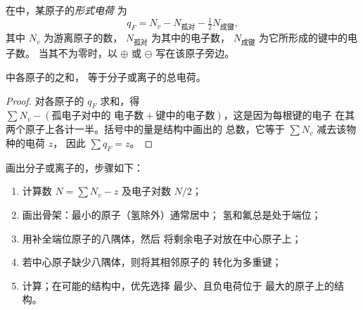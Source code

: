 \begin{definition}[形式电荷]\label{def:b1:lewis-resonance-vsepr:formal-charge}
在中，某原子的\emph{形式电荷}
为
\[
  q_F = N_v - N_{\text{孤对}} - \tfrac12 N_{\text{成键}},
\]
其中 $N_v$ 为游离原子的数，
$N_{\text{孤对}}$ 为其中的电子数，
$N_{\text{成键}}$ 为它所形成的键中的电子数。
当其不为零时，以 $\oplus$ 或 $\ominus$ 写在该原子旁边。
\end{definition}

\begin{proposition}[形式电荷之和等于总电荷]\label{prop:b1:lewis-resonance-vsepr:formal-sum}
中各原子的之和，
等于分子或离子的总电荷。
\end{proposition}

\begin{proof}
对各原子的 $q_F$ 求和，得 $\sum N_v - (\text{孤电子对中的
电子数} + \text{键中的电子数})$，这是因为每根键的电子
在其两个原子上各计一半。括号中的量是结构中画出的
总数，它等于 $\sum N_v$ 减去该物种的电荷 $z$，
因此 $\sum q_F = z$。
\end{proof}

\begin{method}[画路易斯结构]\label{met:b1:lewis-resonance-vsepr:lewis}
画出分子或离子的，步骤如下：
\begin{enumerate}
  \item 计算数 $N = \sum N_v - z$ 及电子对数 $N/2$；
  \item 画出骨架：最小的原子（氢除外）通常居中；
        氢和氟总是处于端位；
  \item 用补全端位原子的八隅体，然后
        将剩余电子对放在中心原子上；
  \item 若中心原子缺少八隅体，则将其相邻原子的
        转化为多重键；
  \item 计算；在可能的结构中，优先选择
        最少、且负电荷位于
        最大的原子上的结构。
\end{enumerate}
\end{method}

